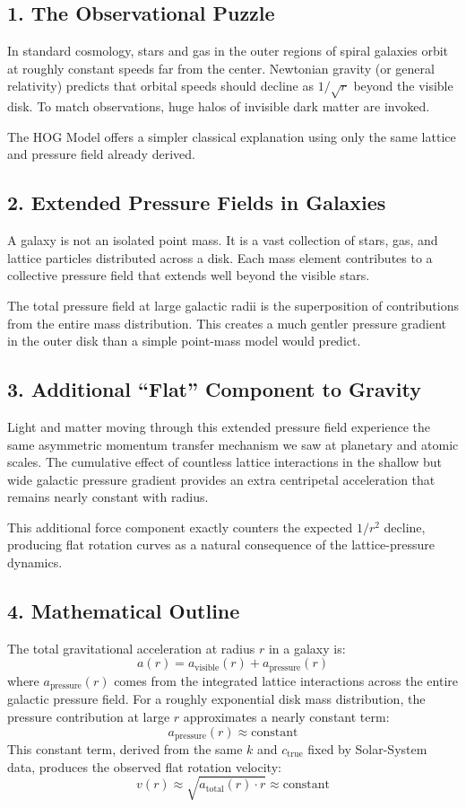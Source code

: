 \documentclass[11pt,a4paper]{book}
\begin{document}
\subsection{1. The Observational Puzzle}
In standard cosmology, stars and gas in the outer regions of spiral galaxies orbit at roughly constant speeds far from the center. Newtonian gravity (or general relativity) predicts that orbital speeds should decline as \( 1/\sqrt{r} \) beyond the visible disk. To match observations, huge halos of invisible dark matter are invoked.

The HOG Model offers a simpler classical explanation using only the same lattice and pressure field already derived.

\subsection{2. Extended Pressure Fields in Galaxies}
A galaxy is not an isolated point mass. It is a vast collection of stars, gas, and lattice particles distributed across a disk. Each mass element contributes to a collective pressure field that extends well beyond the visible stars.

The total pressure field at large galactic radii is the superposition of contributions from the entire mass distribution. This creates a much gentler pressure gradient in the outer disk than a simple point-mass model would predict.

\subsection{3. Additional “Flat” Component to Gravity}
Light and matter moving through this extended pressure field experience the same asymmetric momentum transfer mechanism we saw at planetary and atomic scales. The cumulative effect of countless lattice interactions in the shallow but wide galactic pressure gradient provides an extra centripetal acceleration that remains nearly constant with radius.

This additional force component exactly counters the expected \( 1/r^2 \) decline, producing flat rotation curves as a natural consequence of the lattice-pressure dynamics.

\subsection{4. Mathematical Outline}
The total gravitational acceleration at radius \( r \) in a galaxy is:
\[
a(r) = a_{\text{visible}}(r) + a_{\text{pressure}}(r)
\]
where \( a_{\text{pressure}}(r) \) comes from the integrated lattice interactions across the entire galactic pressure field. For a roughly exponential disk mass distribution, the pressure contribution at large \( r \) approximates a nearly constant term:
\[
a_{\text{pressure}}(r) \approx \text{constant}
\]
This constant term, derived from the same \( k \) and \( c_{\text{true}} \) fixed by Solar-System data, produces the observed flat rotation velocity:
\[
v(r) \approx \sqrt{a_{\text{total}}(r) \cdot r} \approx \text{constant}
\]
\end{document}
